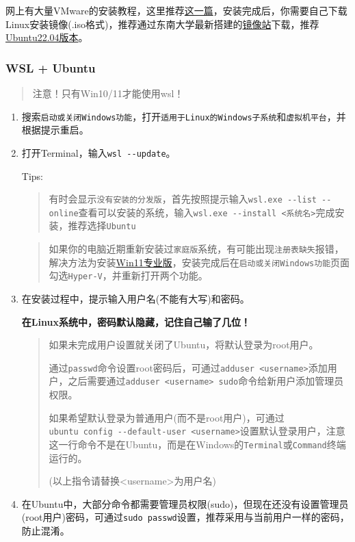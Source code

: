 \documentclass[
]{article}
\begin{document}
网上有大量VMware的安装教程，这里推荐\href{https://zhuanlan.zhihu.com/p/617093823}{这一篇}，安装完成后，你需要自己下载Linux安装镜像(.iso格式)，推荐通过东南大学最新搭建的\href{https://mirrors.seu.edu.cn/}{镜像站}下载，推荐\href{https://mirrors.seu.edu.cn/ubuntu-releases/22.04/ubuntu-22.04.4-desktop-amd64.iso}{Ubuntu22.04版本}。

\subsubsection{WSL + Ubuntu}\label{wsl--ubuntu}

\begin{quote}
  注意！只有Win10/11才能使用wsl！
\end{quote}

\begin{enumerate}
  \def\labelenumi{\arabic{enumi}.}
  \item
        搜索\texttt{启动或关闭Windows功能}，打开\texttt{适用于Linux的Windows子系统}和\texttt{虚拟机平台}，并根据提示重启。
  \item
        打开Terminal，输入\texttt{wsl\ -\/-update}。

        Tips:
        \begin{quote}
          有时会显示\texttt{没有安装的分发版}，首先按照提示输入\texttt{wsl.exe\ -\/-list\ -\/-online}查看可以安装的系统，输入\texttt{wsl.exe\ -\/-install\ \textless{}系统名\textgreater{}}完成安装，推荐选择\texttt{Ubuntu}
        \end{quote}

        \begin{quote}
          如果你的电脑近期重新安装过\texttt{家庭版}系统，有可能出现\texttt{注册表缺失}报错，解决方法为安装\href{https://software.seu.edu.cn/soft/detail/18}{Win11专业版}，安装完成后在\texttt{启动或关闭Windows功能}页面勾选\texttt{Hyper-V}，并重新打开两个功能。
        \end{quote}
  \item
        在安装过程中，提示输入用户名(不能有大写)和密码。

        \textbf{在Linux系统中，密码默认隐藏，记住自己输了几位！}

        \begin{quote}
          如果未完成用户设置就关闭了Ubuntu，将默认登录为root用户。

          通过\texttt{passwd}命令设置root密码后，可通过\texttt{adduser\ \textless{}username\textgreater{}}添加用户，之后需要通过\texttt{adduser\ \textless{}username\textgreater{}\ sudo}命令给新用户添加管理员权限。

          如果希望默认登录为普通用户(而不是root用户)，可通过\texttt{ubuntu\ config\ -\/-default-user\ \textless{}username\textgreater{}}设置默认登录用户，注意这一行命令不是在Ubuntu，而是在Windows的\texttt{Terminal}或\texttt{Command}终端运行的。

          (以上指令请替换\textless{}username\textgreater 为用户名)
        \end{quote}
  \item
        在Ubuntu中，大部分命令都需要管理员权限(sudo)，但现在还没有设置管理员(root用户)密码，可通过\texttt{sudo\ passwd}设置，推荐采用与当前用户一样的密码，防止混淆。
\end{enumerate}
\end{document}
